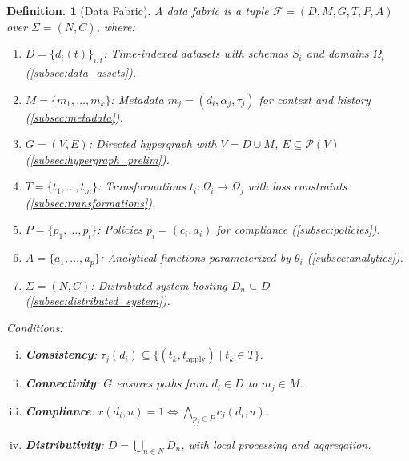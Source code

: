 \documentclass{amsart}
\newtheorem{defn}[thm]{Definition.}
\newcommand\cF{\mathcal{F}}
\begin{document}

\begin{defn}[Data Fabric] \label{defn:data_fabric}
A \emph{data fabric} is a tuple \( \cF = (D, M, G, T, P, A) \) over \( \Sigma = (N, C) \), where:
\begin{enumerate}
    \item \( D = \{d_i(t)\}_{i,t} \): Time-indexed datasets with schemas \( S_i \) and domains \( \Omega_i \) (\cref{subsec:data_assets}).
    \item \( M = \{m_1, \dots, m_k\} \): Metadata \( m_j = (d_i, \alpha_j, \tau_j) \) for context and history (\cref{subsec:metadata}).
    \item \( G = (V, E) \): Directed hypergraph with \( V = D \cup M \), \( E \subseteq \mathcal{P}(V) \) (\cref{subsec:hypergraph_prelim}).
    \item \( T = \{t_1, \dots, t_m\} \): Transformations \( t_i: \Omega_i \to \Omega_j \) with loss constraints (\cref{subsec:transformations}).
    \item \( P = \{p_1, \dots, p_l\} \): Policies \( p_i = (c_i, a_i) \) for compliance (\cref{subsec:policies}).
    \item \( A = \{a_1, \dots, a_p\} \): Analytical functions parameterized by \( \theta_i \) (\cref{subsec:analytics}).
    \item \( \Sigma = (N, C) \): Distributed system hosting \( D_n \subseteq D \) (\cref{subsec:distributed_system}).
\end{enumerate}
Conditions:
\begin{enumerate}[i)]
    \item \textbf{Consistency}: \( \tau_j(d_i) \subseteq \{(t_k, t_{\text{apply}}) \mid t_k \in T\} \).
    \item \textbf{Connectivity}: \( G \) ensures paths from \( d_i \in D \) to \( m_j \in M \).
    \item \textbf{Compliance}: \( r(d_i, u) = 1 \iff \bigwedge_{p_j \in P} c_j(d_i, u) \).
    \item \textbf{Distributivity}: \( D = \bigcup_{n \in N} D_n \), with local processing and aggregation.
\end{enumerate}
\end{defn}
\end{document}
